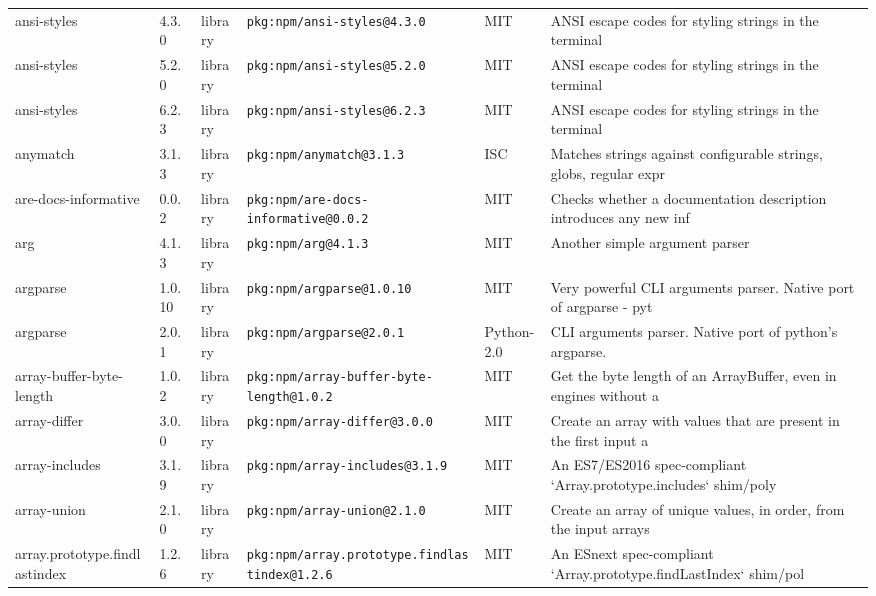 \documentclass[11pt,a4paper]{article}
\begin{document}
\begin{longtable}{|p{4cm}|p{2cm}|p{1.6cm}|p{5cm}|p{1.5cm}|p{3.5cm}|}
\raggedright ansi-styles & 4.3.0 & library & \small\texttt{pkg:npm/ansi-styles@4.3.0} & MIT & \small ANSI escape codes for styling strings in the terminal \\
\raggedright ansi-styles & 5.2.0 & library & \small\texttt{pkg:npm/ansi-styles@5.2.0} & MIT & \small ANSI escape codes for styling strings in the terminal \\
\raggedright ansi-styles & 6.2.3 & library & \small\texttt{pkg:npm/ansi-styles@6.2.3} & MIT & \small ANSI escape codes for styling strings in the terminal \\
\raggedright anymatch & 3.1.3 & library & \small\texttt{pkg:npm/anymatch@3.1.3} & ISC & \small Matches strings against configurable strings, globs, regular expr \\
\raggedright are-docs-informative & 0.0.2 & library & \small\texttt{pkg:npm/are-docs-informative@0.0.2} & MIT & \small Checks whether a documentation description introduces any new inf \\
\raggedright arg & 4.1.3 & library & \small\texttt{pkg:npm/arg@4.1.3} & MIT & \small Another simple argument parser \\
\raggedright argparse & 1.0.10 & library & \small\texttt{pkg:npm/argparse@1.0.10} & MIT & \small Very powerful CLI arguments parser. Native port of argparse - pyt \\
\raggedright argparse & 2.0.1 & library & \small\texttt{pkg:npm/argparse@2.0.1} & Python-2.0 & \small CLI arguments parser. Native port of python's argparse. \\
\raggedright array-buffer-byte-length & 1.0.2 & library & \small\texttt{pkg:npm/array-buffer-byte-length@1.0.2} & MIT & \small Get the byte length of an ArrayBuffer, even in engines without a  \\
\raggedright array-differ & 3.0.0 & library & \small\texttt{pkg:npm/array-differ@3.0.0} & MIT & \small Create an array with values that are present in the first input a \\
\raggedright array-includes & 3.1.9 & library & \small\texttt{pkg:npm/array-includes@3.1.9} & MIT & \small An ES7/ES2016 spec-compliant `Array.prototype.includes` shim/poly \\
\raggedright array-union & 2.1.0 & library & \small\texttt{pkg:npm/array-union@2.1.0} & MIT & \small Create an array of unique values, in order, from the input arrays \\
\raggedright array.prototype.findlastindex & 1.2.6 & library & \small\texttt{pkg:npm/array.prototype.findlastindex@1.2.6} & MIT & \small An ESnext spec-compliant `Array.prototype.findLastIndex` shim/pol \\

\end{longtable}
\end{document}
